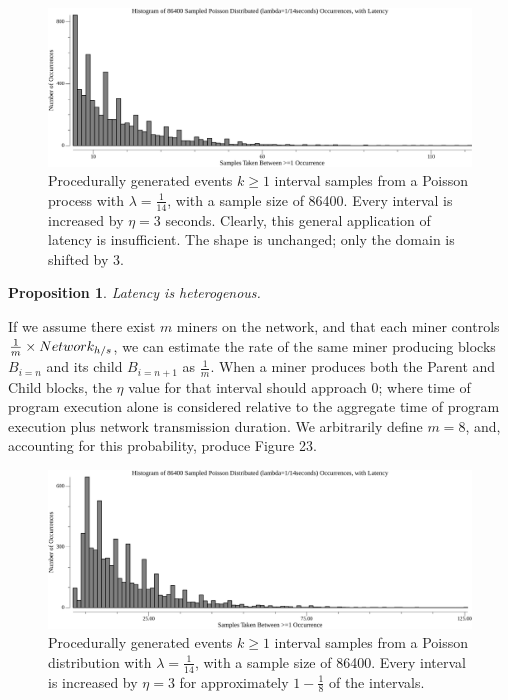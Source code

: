 \documentclass[11pt]{article}
\theoremstyle{plain}
\newtheorem{proposition}{Proposition}[section]
\begin{document}
\begin{figure}[tph]
    \centering
    \includegraphics[width=1.0\textwidth]{go-block-step/out/vis_poisson_samples_eventintervals_latencynaive_hist.png}
    \caption{
        Procedurally generated events $k \geq 1$ interval samples from a Poisson process
        with $\lambda = \frac{1}{14}$, with a sample size of 86400.
        Every interval is increased by $\eta=3$ seconds.
        Clearly, this general application of latency is insufficient.
        The shape is unchanged; only the domain is shifted by $3$.
    }
\end{figure}

\vspace{5mm}
\begin{proposition}
    Latency is heterogenous.
\end{proposition}

If we assume there exist $m$ miners on the network, and that each miner
controls $\frac{1}{m} \times Network_{h/s}$, we can estimate the rate of the
same miner producing blocks $B_{i=n}$ and its child $B_{i=n+1}$ as
$\frac{1}{m}$.
When a miner produces both the Parent and Child blocks, the $\eta$ value for
that interval should approach $0$; where time of program execution alone is
considered relative to the aggregate time of program execution plus network
transmission duration.
We arbitrarily define $m=8$, and, accounting for this probability, produce
Figure 23.

\begin{figure}[tph]
    \centering

    \includegraphics[width=1.0\textwidth]{go-block-step/out/vis_poisson_samples_eventintervals_latencysamesame_hist.png}
    \caption{
        Procedurally generated events $k \geq 1$ interval samples from a Poisson distribution
        with $\lambda = \frac{1}{14}$, with a sample size of 86400.
        Every interval is increased by $\eta=3$ for approximately
        $1-\frac{1}{8}$ of the intervals.
    }
\end{figure}
\end{document}
